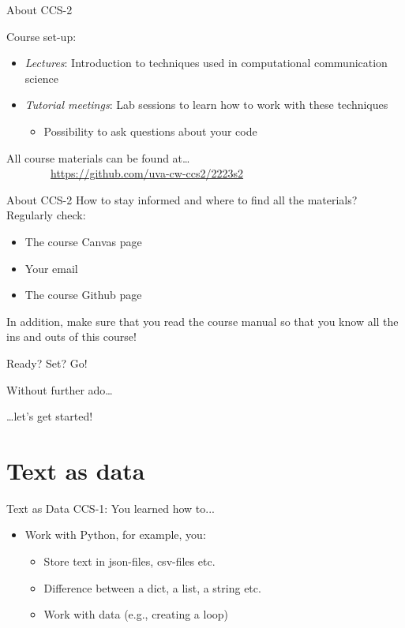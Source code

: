 \documentclass[handout]{beamer}
\begin{document}
\begin{frame}{About CCS-2} 
	
Course set-up:
\begin{itemize}[<+->]
	\item \emph{Lectures}: Introduction to techniques used in computational communication science
	\item \emph{Tutorial meetings}: Lab sessions to learn how to work with these techniques
	\begin{itemize}
		\item Possibility to ask questions about your code
	\end{itemize}
\end{itemize}

\end{frame}

\begin{frame} 
	All course materials can be found at\ldots \\
	~~~~~~~~\url{https://github.com/uva-cw-ccs2/2223s2}
\end{frame}

\begin{frame}{About CCS-2} 
How to stay informed and where to find all the materials? Regularly check:	
	\begin{itemize}
		\item The course Canvas page
		\item Your email
		\item The course Github page
	\end{itemize}
In addition, make sure that you read the course manual so that you know all the ins and outs of this course!
\end{frame}


\begin{frame}{Ready? Set? Go!} 
	
	Without further ado\dots
	
	\dots let's get started!
	
\end{frame}

\section{Text as data}

\begin{frame}{Text as Data}
	CCS-1: You learned how to...
		\begin{itemize}
		\item Work with Python, for example, you:
		\begin{itemize}
			\item Store text in json-files, csv-files etc.
			\item Difference between a dict, a list, a string etc.
			\item Work with data (e.g., creating a loop)
		\end{itemize}
	\end{itemize}
	\end{frame}
\end{document}
